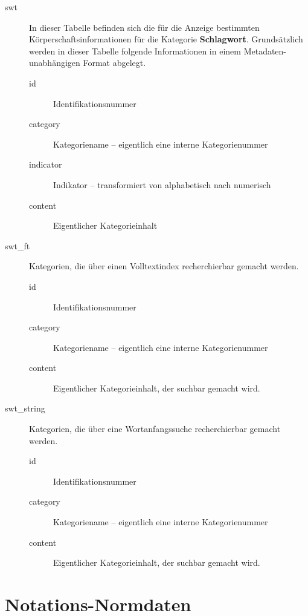 \documentclass[11pt, twoside, a4paper, BCOR8mm, DIV12, bibtotoc,idxtotoc]{scrbook}
\begin{document}
\begin{description}
\item[swt] In dieser Tabelle befinden sich die für die Anzeige
  bestimmten Körperschaftsinformationen für die Kategorie
  \textbf{Schlagwort}. Grundsätzlich werden in dieser Tabelle
  folgende Informationen in einem Metadaten-unabhängigen Format
  abgelegt.
  \begin{description}
  \item[id] Identifikationsnummer
  \item[category] Kategoriename -- eigentlich eine interne Kategorienummer
  \item[indicator] Indikator -- transformiert von alphabetisch nach numerisch
  \item[content] Eigentlicher Kategorieinhalt
  \end{description}
\item[swt\_ft] Kategorien, die über einen Volltextindex recherchierbar
  gemacht werden.
  \begin{description}
  \item[id] Identifikationsnummer
  \item[category] Kategoriename -- eigentlich eine interne Kategorienummer
  \item[content] Eigentlicher Kategorieinhalt, der suchbar gemacht wird.
  \end{description}
\item[swt\_string] Kategorien, die über eine Wortanfangssuche
  recherchierbar gemacht werden.
  \begin{description}
  \item[id] Identifikationsnummer
  \item[category] Kategoriename -- eigentlich eine interne Kategorienummer
  \item[content] Eigentlicher Kategorieinhalt, der suchbar gemacht wird.
  \end{description}
\end{description}

\section{Notations-Normdaten}
\end{document}

